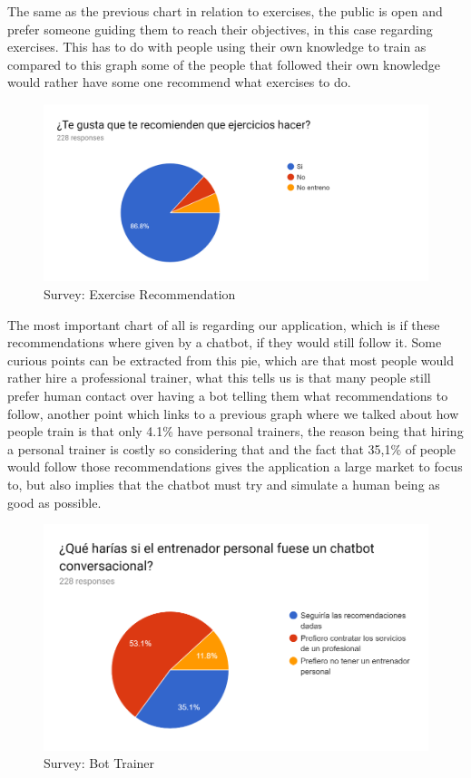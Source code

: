 The same as the previous chart in relation to exercises, the public is open and prefer someone guiding them to reach their objectives, in this case regarding exercises. This has to do with people using their own knowledge to train as compared to this graph some of the people that followed their own knowledge would rather have some one recommend what exercises to do.

\begin{center}
	\begin{figure}[h!]
		\centering
		\includegraphics[scale=0.25]{./images/4-rec-exe}
		\caption{Survey: Exercise Recommendation}
		\label{4_rec_exe}
	\end{figure}
\end{center}

The most important chart of all is regarding our application, which is if these recommendations where given by a chatbot, if they would still follow it. Some curious points can be extracted from this pie, which are that most people would rather hire a professional trainer, what this tells us is that many people still prefer human contact over having a bot telling them what recommendations to follow, another point which links to a previous graph where we talked about how people train is that only 4.1\% have personal trainers, the reason being that hiring a personal trainer is costly so considering that and the fact that 35,1\% of people would follow those recommendations gives the application a large market to focus to, but also implies that the chatbot must try and simulate a human being as good as possible.

\begin{center}
	\begin{figure}[h!]
		\centering
		\includegraphics[scale=1]{./images/4-bot-trainer}
		\caption{Survey: Bot Trainer}
		\label{4_bot_trainer}
	\end{figure}
\end{center}

